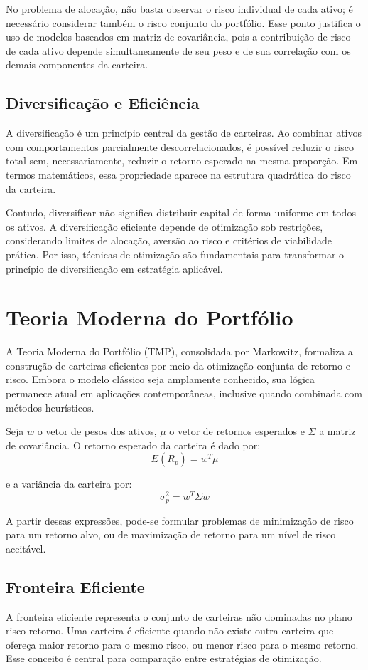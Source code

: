 \documentclass[
  12pt,
  oneside,
  a4paper,
  brazil
]{abntex2}
\begin{document}
No problema de alocação, não basta observar o risco individual de cada ativo; é necessário considerar também o risco conjunto do portfólio. Esse ponto justifica o uso de modelos baseados em matriz de covariância, pois a contribuição de risco de cada ativo depende simultaneamente de seu peso e de sua correlação com os demais componentes da carteira.

\subsection{Diversificação e Eficiência}
A diversificação é um princípio central da gestão de carteiras. Ao combinar ativos com comportamentos parcialmente descorrelacionados, é possível reduzir o risco total sem, necessariamente, reduzir o retorno esperado na mesma proporção. Em termos matemáticos, essa propriedade aparece na estrutura quadrática do risco da carteira.

Contudo, diversificar não significa distribuir capital de forma uniforme em todos os ativos. A diversificação eficiente depende de otimização sob restrições, considerando limites de alocação, aversão ao risco e critérios de viabilidade prática. Por isso, técnicas de otimização são fundamentais para transformar o princípio de diversificação em estratégia aplicável.

\section{Teoria Moderna do Portfólio}
A Teoria Moderna do Portfólio (TMP), consolidada por Markowitz, formaliza a construção de carteiras eficientes por meio da otimização conjunta de retorno e risco. Embora o modelo clássico seja amplamente conhecido, sua lógica permanece atual em aplicações contemporâneas, inclusive quando combinada com métodos heurísticos.

Seja $w$ o vetor de pesos dos ativos, $\mu$ o vetor de retornos esperados e $\Sigma$ a matriz de covariância. O retorno esperado da carteira é dado por:
\[
E(R_p)=w^T\mu
\]

e a variância da carteira por:
\[
\sigma_p^2=w^T\Sigma w
\]

A partir dessas expressões, pode-se formular problemas de minimização de risco para um retorno alvo, ou de maximização de retorno para um nível de risco aceitável.

\subsection{Fronteira Eficiente}
A fronteira eficiente representa o conjunto de carteiras não dominadas no plano risco-retorno. Uma carteira é eficiente quando não existe outra carteira que ofereça maior retorno para o mesmo risco, ou menor risco para o mesmo retorno. Esse conceito é central para comparação entre estratégias de otimização.
\end{document}
